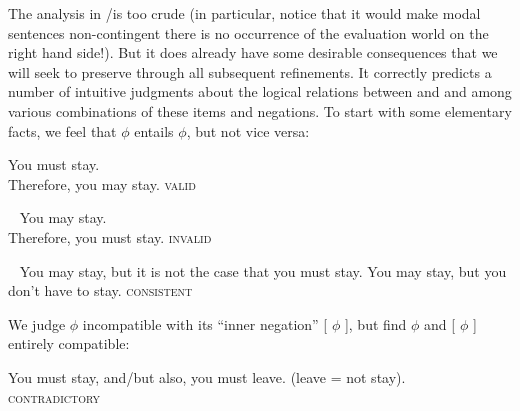 The analysis in \LLast/\Last is too crude (in particular, notice that it would
make modal sentences non-contingent \dash there is no occurrence of the
evaluation world on the right hand side!). But it does already have some
desirable consequences that we will seek to preserve through all subsequent
refinements. It correctly predicts a number of intuitive judgments about the
logical relations between  and  and among
various combinations of these items and negations. To start with some elementary
facts, we feel that  $\phi$ entails  $\phi$,
but not vice versa:

\ex You must stay.\\
Therefore, you may stay. \hfill\textsc{valid} \xe

\ex~ You may stay.\\
Therefore, you must stay. \hfill\textsc{invalid} \xe

%
\pex~\label{ex:stilted} \a You may stay, but it is not the case that you must
stay. \a You may stay, but you don't have to stay. \hfill\textsc{consistent} \xe

We judge  $\phi$ incompatible with its ``inner negation''
 [ $\phi$ ], but find  $\phi$
and  [ $\phi$ ] entirely compatible:

\ex You must stay, and/but also, you must leave. (leave = not stay).\\
\hfill\textsc{contradictory} \xe

